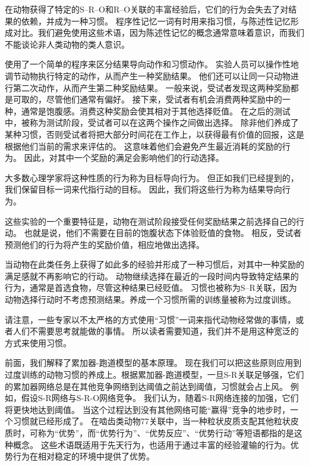 在动物获得了特定的S–R–O和R–O关联的丰富经验后，它们的行为会失去了对结果的依赖，并成为一种习惯。
程序性记忆一词有时用来指习惯，与陈述性记忆形成对比。我们避免使用这些术语，因为陈述性记忆的概念通常意味着意识，而我们不能谈论非人类动物的类人意识。\par


\cite{balleine2003effect}使用了一个简单的程序来区分结果导向动作和习惯动作。
实验人员可以操作性地调节动物执行特定的动作，从而产生一种奖励结果。
他们还可以让同一只动物进行第二次动作，从而产生第二种奖励结果。
一般来说，受试者发现这两种奖励都是可取的，尽管他们通常有偏好。
接下来，受试者有机会消费两种奖励中的一种，通常是饱腹感。消费这种奖励会使其相对于其他选择贬值。
在之后的测试中，被称为测试阶段，受试者可以在这两个操作之间做出选择。
除非他们养成了某种习惯，否则受试者将把大部分时间花在工作上，以获得最有价值的回报，这是根据他们当前的需求来评估的。
这意味着他们会避免产生最近消耗的奖励的行为。
因此，对其中一个奖励的满足会影响他们的行动选择。\par


大多数心理学家将这种性质的行为称为目标导向行为。
但正如我们已经提到的，我们保留目标一词来代指行动的目标。
因此，我们将这些行为称为结果导向行为。\par


这些实验的一个重要特征是，动物在测试阶段接受任何奖励结果之前选择自己的行动。
也就是说，他们不需要在目前的饱腹状态下体验贬值的食物。
相反，受试者预测他们的行为将产生的奖励价值，相应地做出选择。\par


当动物在此类任务上获得了如此多的经验并形成了一种习惯后，对其中一种奖励的满足感就不再影响它的行动。
动物继续选择在最近的一段时间内导致特定结果的行为，通常是首选食物，尽管这种结果已经贬值。
习惯也被称为S–R关联，因为动物选择行动时不考虑预测结果。养成一个习惯所需的训练量被称为过度训练。\par


请注意，一些专家以不太严格的方式使用“习惯”一词来指代动物经常做的事情，或者人们不需要思考就能做的事情。
所以读者需要知道，我们并不是用这种宽泛的方式来使用习惯。\par


前面，我们解释了累加器-跑道模型的基本原理。
现在我们可以把这些原则应用到过度训练的动物习惯的养成上。根据累加器-跑道模型，一旦S-R关联足够强，它们的累加器网络总是在其他竞争网络到达阈值之前达到阈值，习惯就会占上风。
例如，假设S-R网络与S-R-O网络竞争。
我们认为，随着S-R网络连接的加强，它们将更快地达到阈值。
当这个过程达到没有其他网络可能“赢得”竞争的地步时，一个习惯就已经形成了。
在啮齿类动物77关联中，当一种粒状皮质支配其他粒状皮质时，可称为“优势”，而“优势行为”、“优势反应”、“优势行动”等短语都指的是这种概念。
这些术语既适用于先天行为，也适用于通过丰富的经验灌输的行为。优势行为在相对稳定的环境中提供了优势。\par


